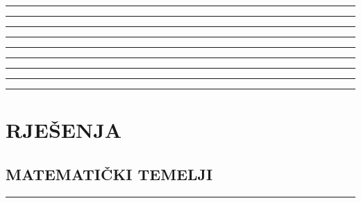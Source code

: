 \documentclass[10pt]{book}
\newcounter{zadatak} %
\newcounter{cjelina}
\begin{document}
\vspace{1cm}

\noindent
{\color{boja} \rule{\linewidth}{0.3mm} }


\vspace{1cm}

\noindent
{\color{boja} \rule{\linewidth}{0.3mm} }


\vspace{1cm}

\noindent
{\color{boja} \rule{\linewidth}{0.3mm} }


\setcounter{zadatak}{0}

\vspace{1cm}

\noindent
{\color{boja} \rule{\linewidth}{0.3mm} }

\vspace{0.2cm} 



\noindent
{\color{boja} \rule{\linewidth}{0.3mm} }

\vspace{0.2cm}




\noindent
{\color{boja} \rule{\linewidth}{0.3mm} }





\noindent
{\color{boja} \rule{\linewidth}{0.3mm} }


\vspace{1cm}

\noindent
{\color{boja} \rule{\linewidth}{0.3mm} }


\vspace{1cm}

\noindent
{\color{boja} \rule{\linewidth}{0.3mm} }


\chapter{RJEŠENJA}
\section{MATEMATIČKI TEMELJI}


{\color{boja} \rule{\linewidth}{0.3mm} }

\end{document}

